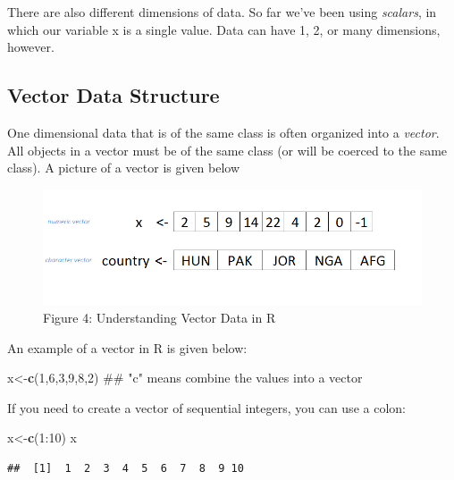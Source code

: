 \documentclass[]{book}
\newenvironment{Shaded}{\begin{snugshade}}{\end{snugshade}}
\newcommand{\KeywordTok}[1]{\textcolor[rgb]{0.13,0.29,0.53}{\textbf{{#1}}}}
\newcommand{\DecValTok}[1]{\textcolor[rgb]{0.00,0.00,0.81}{{#1}}}
\newcommand{\NormalTok}[1]{{#1}}
\begin{document}
There are also different dimensions of data. So far we've been using
\emph{scalars}, in which our variable x is a single value. Data can have
1, 2, or many dimensions, however.

\subsection{Vector Data Structure}\label{vector-data-structure}

One dimensional data that is of the same class is often organized into a
\emph{vector}. All objects in a vector must be of the same class (or
will be coerced to the same class). A picture of a vector is given below

\begin{figure}[htbp]
\centering
\includegraphics{vector.PNG}
\caption{Figure 4: Understanding Vector Data in R}
\end{figure}

An example of a vector in R is given below:

\begin{Shaded}
\begin{Highlighting}[]
\NormalTok{x<-}\KeywordTok{c}\NormalTok{(}\DecValTok{1}\NormalTok{,}\DecValTok{6}\NormalTok{,}\DecValTok{3}\NormalTok{,}\DecValTok{9}\NormalTok{,}\DecValTok{8}\NormalTok{,}\DecValTok{2}\NormalTok{)    ## "c" means combine the values into a vector}
\end{Highlighting}
\end{Shaded}

If you need to create a vector of sequential integers, you can use a
colon:

\begin{Shaded}
\begin{Highlighting}[]
\NormalTok{x<-}\KeywordTok{c}\NormalTok{(}\DecValTok{1}\NormalTok{:}\DecValTok{10}\NormalTok{)}
\NormalTok{x}
\end{Highlighting}
\end{Shaded}

\begin{verbatim}
##  [1]  1  2  3  4  5  6  7  8  9 10
\end{verbatim}
\end{document}
